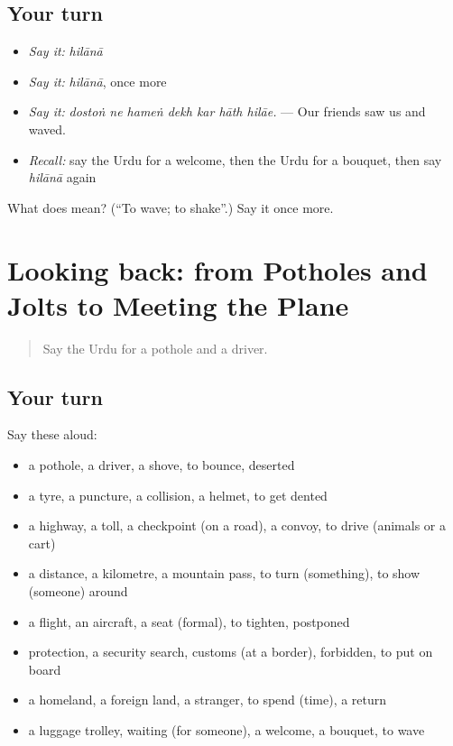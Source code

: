 \subsection*{Your turn}
\begin{itemize}
\raggedright
  \item \emph{Say it:} \emph{hilānā}
  \item \emph{Say it:} \emph{hilānā}, once more
  \item \emph{Say it:} \emph{dostoṅ ne hameṅ dekh kar hāth hilāe.} — Our friends saw us and waved.
  \item \emph{Recall:} say the Urdu for a welcome, then the Urdu for a bouquet, then say \emph{hilānā} again
\end{itemize}

\begin{tcolorbox}[breakable,colback=teal!4,colframe=teal!35!black,title={Before you move on}]
What does  mean? (\textquotedblleft{}To wave; to shake\textquotedblright{}.) Say it once more.
\end{tcolorbox}
\section[(dialogue)]{Looking back: from Potholes and Jolts to Meeting the Plane}

\label{lesson:UR-R401-review-394-401}



\begin{quote}
Say the Urdu for a pothole and a driver.
\end{quote}

\subsection*{Your turn}
Say these aloud:

\begin{itemize}
\raggedright
  \item a pothole, a driver, a shove, to bounce, deserted
  \item a tyre, a puncture, a collision, a helmet, to get dented
  \item a highway, a toll, a checkpoint (on a road), a convoy, to drive (animals or a cart)
  \item a distance, a kilometre, a mountain pass, to turn (something), to show (someone) around
  \item a flight, an aircraft, a seat (formal), to tighten, postponed
  \item protection, a security search, customs (at a border), forbidden, to put on board
  \item a homeland, a foreign land, a stranger, to spend (time), a return
  \item a luggage trolley, waiting (for someone), a welcome, a bouquet, to wave
\end{itemize}

